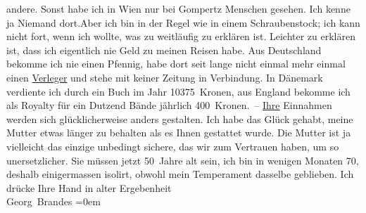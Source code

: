 \begin{ledgroupsized}[t]{13cm}
                    andere. Sonst habe ich in Wien nur bei Gompertz Menschen gesehen. Ich kenne {\pb}ja Niemand dort.\hspace*{2em}Aber ich bin in der Regel wie in einem
                    Schraubenstock; ich kann nicht fort, wenn ich wollte, was zu weitläufig zu
                    erklären ist. Leichter zu erklären ist, dass ich eigentlich nie Geld zu meinen
                    Reisen habe. Aus Deutschland bekomme ich nie
                    einen Pfennig, habe dort seit lange nicht einmal mehr einmal einen \uline{Verleger} und stehe mit keiner Zeitung in Verbindung.
                    In Dänemark verdiente ich durch ein Buch im
                    Jahr 10375 Kronen, aus England bekomme ich als
                    Royalty für ein Dutzend Bände jährlich 400 Kronen. – \uline{Ihre} Einnahmen werden sich glücklicherweise anders gestalten.\pend
           \pstart
           Ich habe das Glück gehabt, meine Mutter etwas länger zu behalten als es Ihnen gestattet wurde. Die
                    Mutter ist ja vielleicht das einzige unbedingt sichere, das wir zum Vertrauen
                    haben, um so unersetzlicher. Sie müssen jetzt 50 Jahre alt sein, ich bin in
                    wenigen Monaten 70, deshalb einigermassen isolirt, obwohl mein Temperament
                    dasselbe geblieben.\pend
           \pstart
           Ich drücke Ihre Hand in alter Ergebenheit{\\[\baselineskip]}\spacefill\mbox{Georg Brandes}\pend
           \leftskip=0em{}
         
         \endnumbering{}\end{ledgroupsized}  \newcommand{\dateiname}{L02040}\newcommand{\titel}{Georg Brandes an Arthur Schnitzler, 19. 10. 1911}\newcommand{\editorInnen}{Martin Anton Müller und Gerd-Hermann Susen}
      